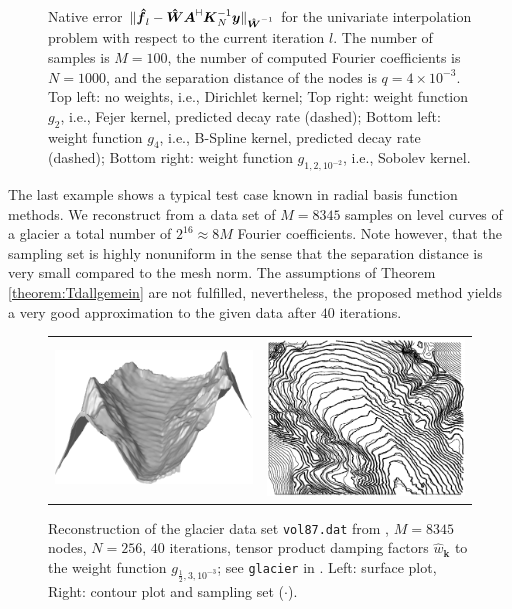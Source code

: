 \documentclass[11pt,a4paper,bibtotoc]{scrartcl}
\newcommand{\zb}[1]{\ensuremath{\boldsymbol{#1}}}
\newcommand{\adj}{{\vdash \hspace*{-1.72mm} \dashv}}
\numberwithin{equation}{section}
\numberwithin{table}{section}
\numberwithin{figure}{section}
\begin{document}
\begin{figure}[ht]
\begin{center}
\begin{tabular}{cc}
    \end{tabular}
  \end{center}
  \caption{Native error $\|\zb {\hat f}_l-\zb {\hat W} \zb A^{\adj} \zb
    K_N^{-1} \zb y\|_{\zb {\hat W}^{-1}}$ for the univariate interpolation
    problem with respect to the current iteration $l$.
    The number of samples is $M=100$, the number of computed Fourier
    coefficients is $N=1000$, and the separation distance of the nodes is
    $q=4\times 10^{-3}$.
    Top left: no weights, i.e., Dirichlet kernel;
    Top right: weight function $g_2$, i.e., Fejer kernel, predicted decay rate
    (dashed);
    Bottom left: weight function $g_4$, i.e., B-Spline kernel, predicted decay rate
    (dashed);
    Bottom right: weight function $g_{1,2,10^{-2}}$, i.e., Sobolev kernel.
    \label{fig:error_decay}}
\end{figure}


The last example shows a typical test case known in  radial basis
function methods. 
We reconstruct from a data set of $M=8345$ samples on level curves of a
glacier a total number of $2^{16} \approx 8 M$ Fourier coefficients.
Note however, that the sampling set is highly nonuniform in the sense that the
separation distance is very small compared to the mesh norm.
The assumptions of Theorem \ref{theorem:Tdallgemein} are not fulfilled,
nevertheless, the proposed method yields a very good approximation to the
given data after $40$ iterations.

\begin{figure}[ht!]
  \begin{center}
    \begin{tabular}{cc}
      \includegraphics[width=6cm]{images/glacier1.eps} &
      \includegraphics[width=6cm]{images/glacier2.eps}
    \end{tabular}
  \end{center}
  \caption{Reconstruction of the glacier data set {\tt vol87.dat} from
    \cite{Franke.Daten}, $M=8345$ nodes, $N=256$, $40$ iterations, tensor
    product damping factors $\hat w_{\zb k}$ to the weight function
    $g_{\frac{1}{2},3,10^{-3}}$; see {\tt glacier\/} in \cite{kupo02C}.
    Left: surface plot, Right: contour plot and sampling set
    ($\cdot$).\label{Fig:glacier}}
\end{figure}
\end{document}
